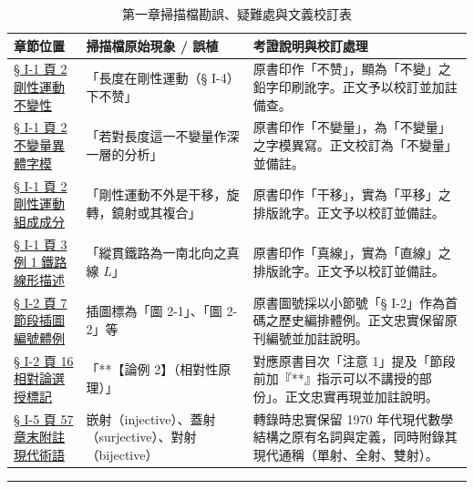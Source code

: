 \documentclass[a4paper,12pt,twoside]{article}
\begin{document}
\begin{table}[H]
\centering
\small
\renewcommand{\arraystretch}{1.35}
\begin{tabularx}{\textwidth}{|p{3.2cm}|p{3.8cm}|X|}
\hline
\textbf{章節位置} & \textbf{掃描檔原始現象 / 誤植} & \textbf{考證說明與校訂處理} \\ \hline

\hyperref[note:b4-ch1-p2-bubiang]{§ I-1 頁 2 剛性運動不變性} & 
「長度在剛性運動（§ I-4）下不赞」 & 
原書印作「不赞」，顯為「不變」之鉛字印刷訛字。正文予以校訂並加註備查。 \\ \hline

\hyperref[note:b4-ch1-p2-bubiangliang]{§ I-1 頁 2 不變量異體字模} & 
「若對長度這一不孌量作深一層的分析」 & 
原書印作「不孌量」，為「不變量」之字模異寫。正文校訂為「不變量」並備註。 \\ \hline

\hyperref[note:b4-ch1-p2-pingyi]{§ I-1 頁 2 剛性運動組成成分} & 
「剛性運動不外是干移，旋轉，鏡射或其複合」 & 
原書印作「干移」，實為「平移」之排版訛字。正文予以校訂並備註。 \\ \hline

\hyperref[note:b4-ch1-p3-zhixian]{§ I-1 頁 3 例 1 鐵路線形描述} & 
「縱貫鐵路為一南北向之真線 $L$」 & 
原書印作「真線」，實為「直線」之排版訛字。正文予以校訂並備註。 \\ \hline

\hyperref[note:b4-ch1-p7-fig2-1]{§ I-2 頁 7 節段插圖編號體例} & 
插圖標為「圖 2-1」、「圖 2-2」等 & 
原書圖號採以小節號「§ I-2」作為首碼之歷史編排體例。正文忠實保留原刊編號並加註說明。 \\ \hline

\hyperref[note:b4-ch1-p16-lorentz]{§ I-2 頁 16 相對論選授標記} & 
「**【論例 2】（相對性原理）」 & 
對應原書目次「注意 1」提及「節段前加『**』指示可以不講授的部份」。正文忠實再現並加註說明。 \\ \hline

\hyperref[note:b4-ch1-p57-appendix-note]{§ I-5 頁 57 章末附註現代術語} & 
嵌射（injective）、蓋射（surjective）、對射（bijective） & 
轉錄時忠實保留 1970 年代現代數學結構之原有名詞與定義，同時附錄其現代通稱（單射、全射、雙射）。 \\ \hline

\end{tabularx}
\caption{第一章掃描檔勘誤、疑難處與文義校訂表}
\label{tab:errata_b4_ch1}
\end{table}

\vspace{1em}
\hrule
\vspace{1em}

\tableofcontents
\newpage


\end{document}
